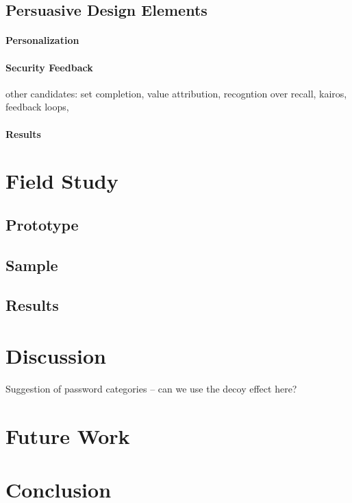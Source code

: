 \subsection{Persuasive Design Elements}

\paragraph{Personalization}
\paragraph{Security Feedback}


other candidates: set completion, value attribution, recogntion over recall, kairos, feedback loops, 

\paragraph{Results}

\section{Field Study}
\subsection{Prototype}
\subsection{Sample}
\subsection{Results}

\section{Discussion}
Suggestion of password categories -- can we use the decoy effect here?

\section{Future Work}
\section{Conclusion}


